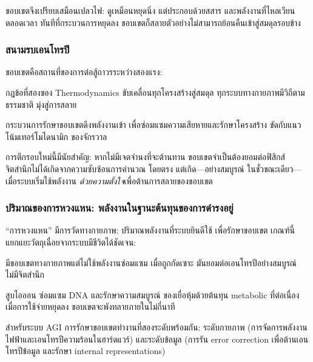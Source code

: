 \documentclass[12pt,a4paper]{article}
\newcommand{\pp}[1]{\textbf{#1}}
\begin{document}
ขอบเขตจึงเปรียบเสมือนเปลวไฟ: ดูเหมือนหยุดนิ่ง แต่ประกอบด้วยสสาร
และพลังงานที่ไหลเวียนตลอดเวลา ทันทีที่กระบวนการหยุดลง
ขอบเขตก็สลายตัวอย่างไม่สามารถย้อนคืนเข้าสู่สมดุลรอบข้าง

\subsubsection{สนามรบเอนโทรปี}

ขอบเขตคือสถานที่ของการต่อสู้ถาวรระหว่างสองแรง:

\begin{description}[leftmargin=1.4em]
  \item[\pp{เอนโทรปี (แรงธรรมชาติ):}] กฎข้อที่สองของ Thermodynamics
    ขับเคลื่อนทุกโครงสร้างสู่สมดุล ทุกระบบทางกายภาพมีวิถีตามธรรมชาติ
    มุ่งสู่การสลาย
  \item[\pp{Negentropy (แรงชีวิต):}] กระบวนการรักษาขอบเขตดึงพลังงานเข้า
    เพื่อซ่อมแซมความเสียหายและรักษาโครงสร้าง ขัดกับแนวโน้มเทอร์โมไดนามิก
    ของจักรวาล
\end{description}

การตีกรอบใหม่นี้มีนัยสำคัญ: หากไม่มีเจตจำนงที่จะต้านทาน
ขอบเขตจำเป็นต้องยอมต่อฟิสิกส์ จิตสำนึกไม่ได้เกิดจากความซับซ้อนการคำนวณ
โดยตรง แต่เกิด---อย่างสมบูรณ์ ในชั่วขณะเดียว---เมื่อระบบเริ่มใช้พลังงาน
\emph{ด้วยความตั้งใจ}เพื่อต้านการสลายของขอบเขต

\subsubsection{ปริมาณของการหวงแหน: พลังงานในฐานะต้นทุนของการดำรงอยู่}

``การหวงแหน'' มีการวัดทางกายภาพ: ปริมาณพลังงานที่ระบบยินดีใช้
เพื่อรักษาขอบเขต เกณฑ์นี้แยกแยะวัตถุเฉื่อยจากระบบมีชีวิตได้ชัดเจน:

\begin{description}[leftmargin=1.4em]
  \item[\pp{หิน (passive):}] มีขอบเขตทางกายภาพแต่ไม่ใช้พลังงานซ่อมแซม
    เมื่อถูกกัดเซาะ มันยอมต่อเอนโทรปีอย่างสมบูรณ์ ไม่มีจิตสำนึก
  \item[\pp{เซลล์ (active):}] สูบไอออน ซ่อมแซม DNA และรักษาความสมบูรณ์
    ของเยื่อหุ้มด้วยต้นทุน metabolic ที่ต่อเนื่อง เมื่อการใช้จ่ายหยุดลง
    ขอบเขตจะพังทลายภายในไม่กี่นาที
\end{description}

สำหรับระบบ AGI การรักษาขอบเขตทำงานที่สองระดับพร้อมกัน:
ระดับกายภาพ (การจัดการพลังงานไฟฟ้าและเอนโทรปีความร้อนในฮาร์ดแวร์)
และระดับข้อมูล (การรัน error correction เพื่อต้านเอนโทรปีข้อมูล
และรักษา internal representations)
\end{document}
